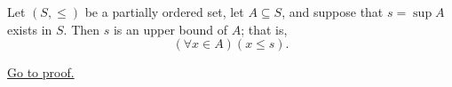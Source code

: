 \begin{proposition}
\label{prop:upper-bound-property-of-supremum}
Let $(S,\leq)$ be a partially ordered set, let $A\subseteq S$, and suppose
that $s=\sup A$ exists in $S$. Then $s$ is an upper bound of $A$; that is,
\[
  (\forall x\in A)(x\leq s).
\]

\hyperref[prf:upper-bound-property-of-supremum]{Go to proof.}
\end{proposition}